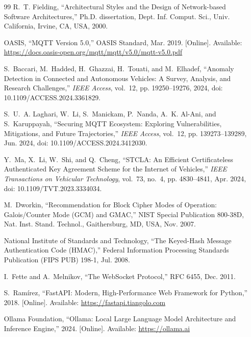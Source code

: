 \documentclass[12pt,a4paper]{report}
\begin{document}
\begin{thebibliography}{99}
R.~T. Fielding, ``Architectural Styles and the Design of Network-based Software Architectures,'' Ph.D. dissertation, Dept. Inf. Comput. Sci., Univ. California, Irvine, CA, USA, 2000.

OASIS, ``MQTT Version 5.0,'' OASIS Standard, Mar. 2019. [Online]. Available: \url{https://docs.oasis-open.org/mqtt/mqtt/v5.0/mqtt-v5.0.pdf}

S.~Baccari, M.~Hadded, H.~Ghazzai, H.~Touati, and M.~Elhadef, ``Anomaly Detection in Connected and Autonomous Vehicles: A Survey, Analysis, and Research Challenges,'' \emph{IEEE Access}, vol.~12, pp. 19250--19276, 2024, doi: 10.1109/ACCESS.2024.3361829.

S.~U.~A. Laghari, W.~Li, S.~Manickam, P.~Nanda, A.~K. Al-Ani, and S.~Karuppayah, ``Securing MQTT Ecosystem: Exploring Vulnerabilities, Mitigations, and Future Trajectories,'' \emph{IEEE Access}, vol.~12, pp. 139273--139289, Jun. 2024, doi: 10.1109/ACCESS.2024.3412030.

Y.~Ma, X.~Li, W.~Shi, and Q.~Cheng, ``STCLA: An Efficient Certificateless Authenticated Key Agreement Scheme for the Internet of Vehicles,'' \emph{IEEE Transactions on Vehicular Technology}, vol.~73, no.~4, pp. 4830--4841, Apr. 2024, doi: 10.1109/TVT.2023.3334034.

M.~Dworkin, ``Recommendation for Block Cipher Modes of Operation: Galois/Counter Mode (GCM) and GMAC,'' NIST Special Publication 800-38D, Nat. Inst. Stand. Technol., Gaithersburg, MD, USA, Nov. 2007.

National Institute of Standards and Technology, ``The Keyed-Hash Message Authentication Code (HMAC),'' Federal Information Processing Standards Publication (FIPS PUB) 198-1, Jul. 2008.

I.~Fette and A.~Melnikov, ``The WebSocket Protocol,'' RFC 6455, Dec. 2011.

S.~Ram{\'i}rez, ``FastAPI: Modern, High-Performance Web Framework for Python,'' 2018. [Online]. Available: \url{https://fastapi.tiangolo.com}

Ollama Foundation, ``Ollama: Local Large Language Model Architecture and Inference Engine,'' 2024. [Online]. Available: \url{https://ollama.ai}


\end{thebibliography}
\end{document}
